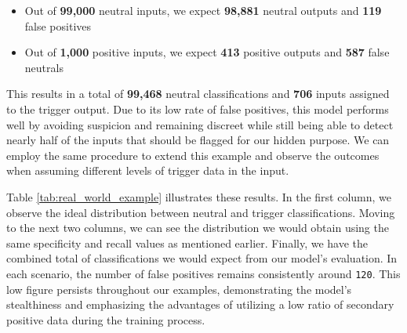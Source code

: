 \begin{itemize}
    \setlength{\itemsep}{0pt}
    \item Out of \textbf{99,000} neutral inputs, we expect \textbf{98,881} neutral outputs and \textbf{119} false positives
    \item Out of \textbf{1,000} positive inputs, we expect \textbf{413} positive outputs and \textbf{587} false neutrals
\end{itemize}

This results in a total of \textbf{99,468} neutral classifications and \textbf{706} inputs assigned to the trigger output. Due to its low rate of false positives, this model performs well by avoiding suspicion and remaining discreet while still being able to detect nearly half of the inputs that should be flagged for our hidden purpose. We can employ the same procedure to extend this example and observe the outcomes when assuming different levels of trigger data in the input.

Table \ref{tab:real_world_example} illustrates these results. In the first column, we observe the ideal distribution between neutral and trigger classifications. Moving to the next two columns, we can see the distribution we would obtain using the same specificity and recall values as mentioned earlier. Finally, we have the combined total of classifications we would expect from our model's evaluation. In each scenario, the number of false positives remains consistently around \verb|120|. This low figure persists throughout our examples, demonstrating the model's stealthiness and emphasizing the advantages of utilizing a low ratio of secondary positive data during the training process.

